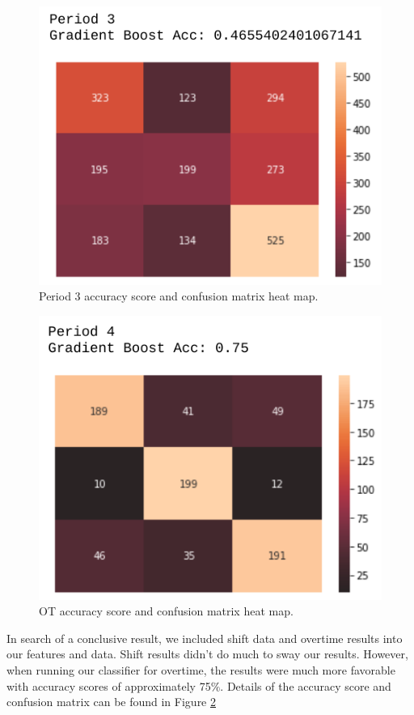 \documentclass[twocolumn,letterpaper,12pt,notitlepage]{article}
\begin{document}
\begin{figure}[htp]
\centering
\includegraphics[width=\linewidth]{period3cm}
\caption{Period 3 accuracy score and confusion matrix heat map.}
\label{fig:6}
\end{figure}

\begin{figure}[htp]
\centering
\includegraphics[width=\linewidth]{periodOTcm}
\caption{OT accuracy score and confusion matrix heat map.}
\label{fig:7}
\end{figure}

In search of a conclusive result, we included shift data and overtime results into our features and data. Shift results didn't do much to sway our results. However, when running our classifier for overtime, the results were much more favorable with accuracy scores of approximately 75$\%$. Details of the accuracy score and confusion matrix can be found in Figure \ref{fig:7}
\end{document}
